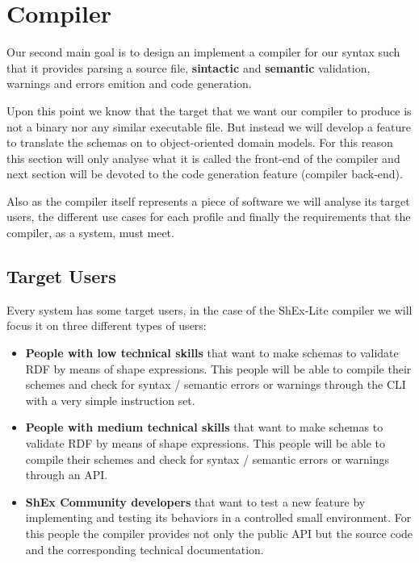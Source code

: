 \section{Compiler}

Our second main goal is to design an implement a compiler for our syntax such that
it provides parsing a source file, \textbf{sintactic} and \textbf{semantic} validation,
warnings and errors emition and code generation.

Upon this point we know that the target that we want our compiler to produce is not a binary
nor any similar executable file. But instead we will develop a feature to translate the
schemas on to object-oriented domain models. For this reason this section will only analyse
what it is called the front-end  of the compiler and next section
will be devoted to the code generation feature (compiler back-end).

Also as the compiler itself represents a piece of software we will analyse its target users,
the different use cases for each profile and finally the requirements that the compiler, as
a system, must meet.

\subsection{Target Users}
Every system has some target users, in the case of the ShEx-Lite compiler we will focus it on three different types of users:
\begin{itemize}
    \item \textbf{People with low technical skills} that want to make schemas to validate RDF by means
    of shape expressions. This people will be able to compile their schemes and check for
    syntax / semantic errors or warnings through the CLI with a very simple instruction set.
    \item \textbf{People with medium technical skills} that want to make schemas to validate RDF by means
    of shape expressions. This people will be able to compile their schemes and check for
    syntax / semantic errors or warnings through an API.
    \item \textbf{ShEx Community developers} that want to test a new feature by implementing and
    testing its behaviors in a controlled small environment. For this people the compiler
    provides not only the public API but the source code and the corresponding technical
    documentation. 
\end{itemize}

